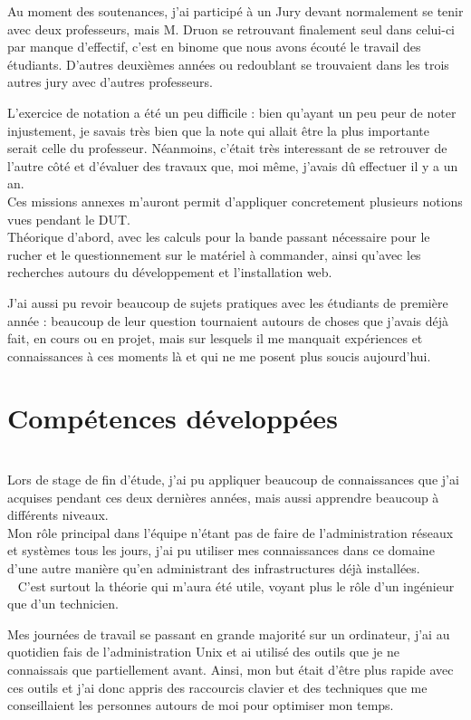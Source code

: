 \documentclass[11pt,french,a4paper]{report}
\begin{document}
Au moment des soutenances, j'ai participé à un Jury devant normalement se tenir avec deux professeurs, mais M. Druon se retrouvant 
finalement seul dans celui-ci par manque d'effectif, c'est en binome que nous avons écouté le travail des étudiants.
D'autres deuxièmes années ou redoublant se trouvaient dans les trois autres jury avec d'autres professeurs. 

L'exercice de notation a été un peu difficile : bien qu'ayant un peu peur de noter injustement,
je savais très bien que la note qui allait être la plus importante serait celle 
du professeur. Néanmoins, c'était très interessant de se retrouver de l'autre côté et d'évaluer des travaux que, moi même, 
j'avais dû effectuer il y a un an. \\


Ces missions annexes m'auront permit d'appliquer concretement plusieurs notions vues pendant le DUT. \\
Théorique d'abord, avec les calculs pour la bande passant nécessaire pour le rucher et le questionnement sur le matériel à commander, ainsi
qu'avec les recherches autours du développement et l'installation web. 

J'ai aussi pu revoir beaucoup de sujets pratiques avec les étudiants de première année : beaucoup de leur question tournaient autours 
de choses que j'avais déjà fait, en cours ou en projet,  mais sur lesquels il me manquait expériences et connaissances à ces moments là et
qui ne me posent plus soucis aujourd'hui. \\


    \section{Compétences développées} \\

Lors de stage de fin d'étude, j'ai pu appliquer beaucoup de connaissances que j'ai acquises pendant ces deux dernières années,
mais aussi apprendre beaucoup à différents niveaux.\\

Mon rôle principal dans l'équipe n'étant pas de faire de l'administration réseaux et systèmes tous les jours, 
j'ai pu utiliser mes connaissances dans ce domaine d'une autre manière qu'en administrant des infrastructures déjà installées. \\ 
C'est surtout la théorie qui m'aura été utile, voyant plus le rôle d'un ingénieur que d'un technicien. 

Mes journées de travail se passant en grande majorité sur un ordinateur, j'ai au quotidien fais de l'administration Unix et ai
utilisé des outils que je ne connaissais que partiellement avant. Ainsi, mon but était d'être plus rapide avec ces outils 
et j'ai donc appris des raccourcis clavier et des techniques que me conseillaient les personnes autours de moi pour optimiser 
mon temps. \\
\end{document}
